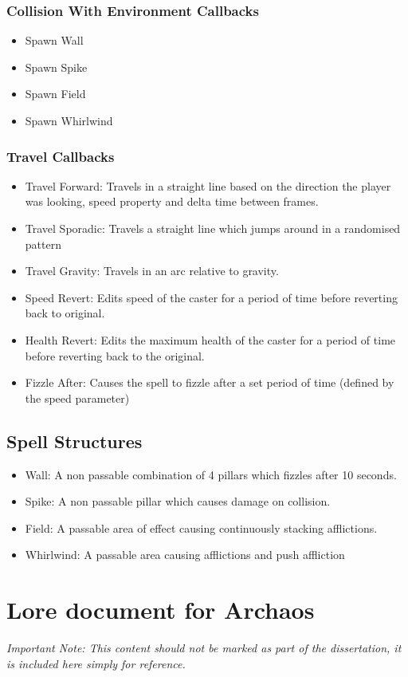 \documentclass[12pt,a4paper]{report}
\begin{document}
\subsection{Collision With Environment Callbacks}

\begin{itemize}
    \item Spawn Wall
    \item Spawn Spike
    \item Spawn Field
    \item Spawn Whirlwind
\end{itemize}

\subsection{Travel Callbacks}

\begin{itemize}
    \item Travel Forward: Travels in a straight line based on the direction the player was looking, speed property and delta time between frames.
    \item Travel Sporadic: Travels a straight line which jumps around in a randomised pattern
    \item Travel Gravity: Travels in an arc relative to gravity.
    \item Speed Revert: Edits speed of the caster for a period of time before reverting back to original.
    \item Health Revert: Edits the maximum health of the caster for a period of time before reverting back to the original.
    \item Fizzle After: Causes the spell to \gls{fizzle} after a set period of time (defined by the speed parameter)
\end{itemize}

\section{Spell Structures} \label{spellStructures}

\begin{itemize}
    \item Wall: A non passable combination of 4 pillars which \gls{fizzle}s after 10 seconds.
    \item Spike: A non passable pillar which causes damage on collision.
    \item Field: A passable area of effect causing continuously stacking afflictions.
    \item Whirlwind: A passable area causing afflictions and push affliction
\end{itemize}

\chapter{Lore document for Archaos} \label{lore}

\textit{Important Note: This content should not be marked as part of the dissertation, it is included here simply for reference.}


\end{document}
